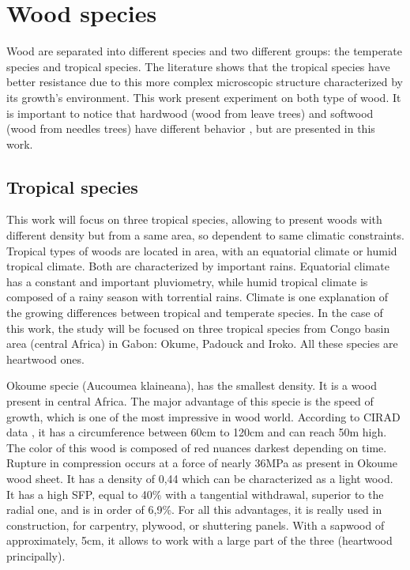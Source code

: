 \section{Wood species}

Wood are separated into different species and two different groups: the temperate species and tropical species. The literature shows that the tropical species have better resistance due to this more complex microscopic structure characterized by its growth’s environment. This work present experiment on both type of wood. It is important to notice that hardwood (wood from leave trees) and  softwood (wood from needles trees) have different behavior \parencite{Reference2}, but are presented in this work.


\subsection{Tropical species}

This work will focus on three tropical species, allowing to present woods with different density but from a same area, so dependent to same climatic constraints. Tropical types of woods are located in area, with an equatorial climate or humid tropical climate. Both are characterized by important rains. Equatorial climate has a constant and important pluviometry, while humid tropical climate is composed of a rainy season with torrential rains. Climate is one explanation of the growing differences between tropical and temperate species. In the case of this work, the study will be focused on three tropical species from Congo basin area (central Africa) in Gabon: Okume, Padouck and Iroko. All these species are heartwood ones. 

Okoume specie (Aucoumea klaineana), has the smallest density. It is a wood present in central Africa. The major advantage of this specie is the speed of growth, which is one of the most impressive in wood world. According to CIRAD data \parencite{Reference5}, it has a circumference between 60cm to 120cm and can reach 50m high. The color of this wood is composed of red nuances darkest depending on time. Rupture in compression occurs at a force of nearly 36\si{\mega\pascal} as \parencite{Reference5} present in Okoume wood sheet. It has a density of 0,44 which can be characterized as a light wood. It has a high SFP, equal to 40\% with a tangential withdrawal, superior to the radial one, and is in order of 6,9\%. For all this advantages, it is really used in construction, for carpentry, plywood, or shuttering panels. With a sapwood of approximately, 5\si{\centi\meter}, it allows to work with a large part of the three (heartwood principally). 

